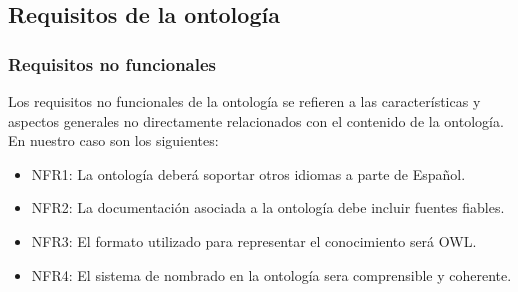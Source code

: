 \documentclass[a4paper,12pt]{article}
\begin{document}
	\subsection{Requisitos de la ontología}
	\subsubsection{Requisitos no funcionales}
	Los requisitos no funcionales de la ontología se refieren a las características y aspectos generales no directamente relacionados con el contenido de la ontología. En nuestro caso son los siguientes:
	\begin{itemize}
		\item NFR1: La ontología deberá soportar otros idiomas a parte de Español.
		\item NFR2: La documentación asociada a la ontología debe incluir fuentes fiables.
		\item NFR3: El formato utilizado para representar el conocimiento será OWL.
		\item NFR4: El sistema de nombrado en la ontología sera comprensible y coherente.
	\end{itemize}
\end{document}
